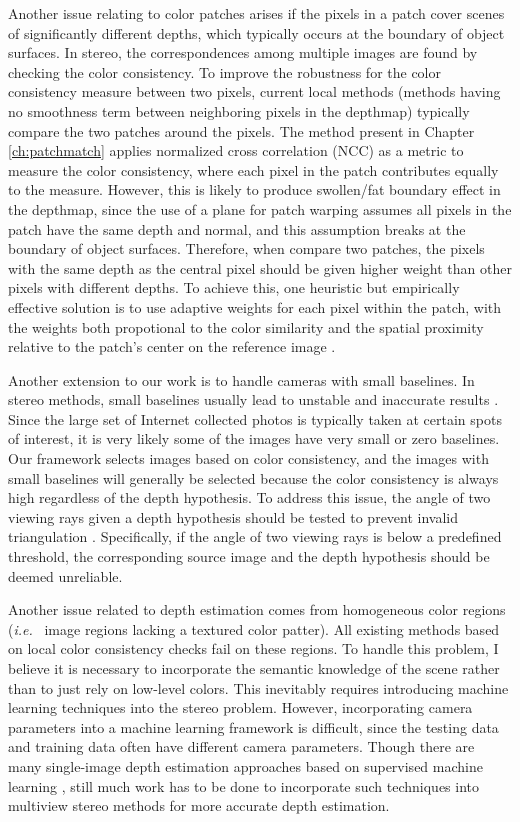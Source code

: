 Another issue relating to color patches arises if the pixels in a patch cover scenes of significantly different depths, which typically occurs at the boundary of object surfaces. 
In stereo, the correspondences among multiple images are found by checking the color consistency.
To improve the robustness for the color consistency measure between two pixels, current local methods (\ie methods having no smoothness term between neighboring pixels in the depthmap) typically compare the two patches around the pixels. The method present in Chapter \ref{ch:patchmatch} applies normalized cross correlation (NCC) as a metric to measure the color consistency, where each pixel in the patch contributes equally to the measure. 
However, this is likely to produce swollen/fat boundary effect in the depthmap, since the use of a plane for patch warping assumes all pixels in the patch have the same depth and normal, and this assumption breaks at the boundary of object surfaces. 
Therefore, when compare two patches, the pixels with the same depth as the central pixel should be given higher weight than other pixels with different depths. To achieve this, one heuristic but empirically effective solution is to use adaptive weights for each pixel within the patch, with the weights both propotional to the color similarity and the spatial proximity relative to the patch's center on the reference image \cite{Yoon06adaptivesupport_weight}. 

Another extension to our work is to handle cameras with small baselines. In stereo methods, small baselines usually lead to unstable and inaccurate results \cite{Hartley2004}. Since the large set of Internet collected photos is typically taken at certain spots of interest, it is very likely some of the images have very small or zero baselines. Our framework selects images based on color consistency, and the images with small baselines will generally be selected because the color consistency is always high regardless of the depth hypothesis. To address this issue, the angle of two viewing rays given a depth hypothesis should be tested to prevent invalid triangulation \cite{Gallup08}. Specifically, if the angle of two viewing rays is below a predefined threshold, the corresponding source image and the depth hypothesis should be deemed  unreliable.

Another issue related to depth estimation comes from homogeneous color regions (\emph{i.e.}~ image regions lacking a textured color patter).
All existing methods based on local color consistency checks fail on these regions. To handle this problem, I believe it is necessary to incorporate the semantic knowledge of the scene rather than to just rely on low-level colors. This inevitably requires introducing machine learning techniques into the stereo problem. However, incorporating camera parameters into a machine learning framework is difficult, since the testing data and training data often have different camera parameters. Though there are many single-image depth estimation approaches based on supervised machine learning  \cite{Hoiem_CGRAPH2005,Saxena_IJCV2008,eigen2014depth,Liu2014,zhuo2015indoor}, still much work has to be done to incorporate such techniques into multiview stereo methods for more accurate depth estimation.

